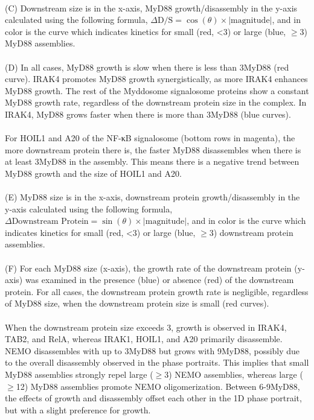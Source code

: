 \begin{centering}
{\\
(C) Downstream size is in the x-axis, MyD88 growth/disassembly in the y-axis calculated using the following formula, $\Delta\text{D/S} = \cos(\theta) \times |\text{magnitude}|$, and in color is the curve which indicates kinetics for small (red, <3\times) or large (blue, $\geq$3\times) MyD88 assemblies.
\\
\\
(D) In all cases, MyD88 growth is slow when there is less than 3\times MyD88 (red curve). IRAK4 promotes MyD88 growth synergistically, as more IRAK4 enhances MyD88 growth. The rest of the Myddosome signalosome proteins show a constant MyD88 growth rate, regardless of the downstream protein size in the complex. In IRAK4, MyD88 grows faster when there is more than 3\times MyD88 (blue curves).
\\
\\
For HOIL1 and A20 of the NF-κB signalosome (bottom rows in magenta), the more downstream protein there is, the faster MyD88 disassembles when there is at least 3\times MyD88 in the assembly. This means there is a negative trend between MyD88 growth and the size of HOIL1 and A20.
\\
\\
(E) MyD88 size is in the x-axis, downstream protein growth/disassembly in the y-axis calculated using the following formula, $\Delta\text{Downstream Protein} = \sin(\theta) \times |\text{magnitude}|$, and in color is the curve which indicates kinetics for small (red, <3\times) or large (blue, $\geq$3\times) downstream protein assemblies.
\\
\\
(F) For each MyD88 size (x-axis), the growth rate of the downstream protein (y-axis) was examined in the presence (blue) or absence (red) of the downstream protein. For all cases, the downstream protein growth rate is negligible, regardless of MyD88 size, when the downstream protein size is small (red curves).
\\
\\
When the downstream protein size exceeds 3\times, growth is observed in IRAK4, TAB2, and RelA, whereas IRAK1, HOIL1, and A20 primarily disassemble. NEMO disassembles with up to 3\times MyD88 but grows with 9\times MyD88, possibly due to the overall disassembly observed in the phase portraits. This implies that small MyD88 assemblies strongly repel large ($\geq$3\times) NEMO assemblies, whereas large ($\geq$12\times) MyD88 assemblies promote NEMO oligomerization. Between 6-9\times MyD88, the effects of growth and disassembly offset each other in the 1D phase portrait, but with a slight preference for growth.
}
\end{centering}
